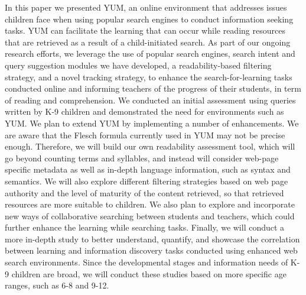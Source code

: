 \documentclass{sig-alternate-05-2015}
\begin{document}
In this paper we presented YUM, an online environment that addresses issues children face when using popular search engines to conduct information seeking tasks. YUM can facilitate the learning that can occur while reading resources that are retrieved as a result of a child-initiated search. As part of our ongoing research efforts, we leverage the use of popular search engines, search intent and query suggestion modules we have developed, a readability-based filtering strategy, and a novel tracking strategy, to enhance the search-for-learning tasks conducted online and informing teachers of the progress of their students, in term of reading and comprehension. We conducted an initial assessment using queries written by K-9 children and demonstrated the need for environments such as YUM. 
We plan to extend YUM by implementing a number of enhancements. We are aware that the Flesch formula currently used in YUM may not be precise enough. Therefore, we will build our own readability assessment tool, which will go beyond counting terms and syllables, and instead will consider web-page specific metadata as well as in-depth language information, such as syntax and semantics.  We will also explore different filtering strategies based on web page authority and the level of maturity of the content retrieved, so that retrieved resources are more suitable to children. We also plan to explore and incorporate new ways of collaborative searching between students and teachers, which could further enhance the learning while searching tasks.  Finally, we will conduct a more in-depth study to better understand, quantify, and showcase the correlation between learning and information discovery tasks conducted using enhanced web search environments.  Since the developmental stages and information needs of K-9 children are broad, we will conduct these studies based on more specific age ranges, such as 6-8 and 9-12. 

%


%
%
\end{document}
